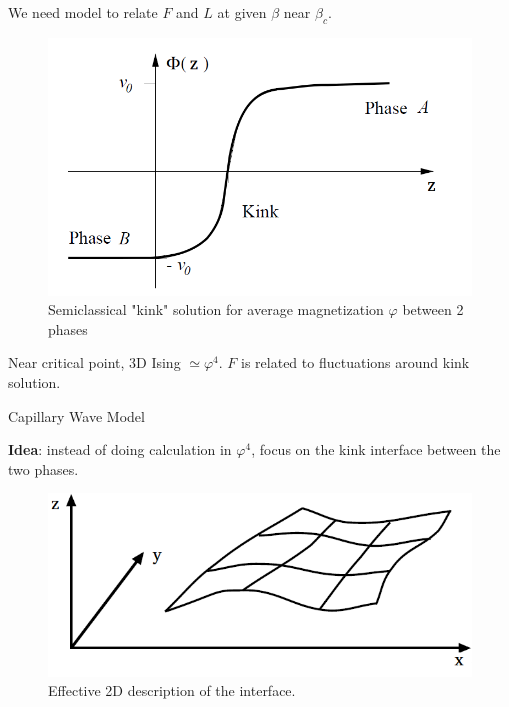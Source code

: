 \documentclass[12pt,handout]{beamer}
\begin{document}
\begin{frame}
\begin{center}
We need model to relate $F$ and $L$ at given $\beta$ near $\beta_c$.
\begin{figure}
\centering
\includegraphics[scale=0.30, center]{kink.png}
\caption{\centering Semiclassical "kink" solution for average magnetization $\varphi$ between 2 phases 
\label{fig:kink}}
\end{figure}

Near critical point, 3D Ising $\simeq \varphi ^4$. $F$ is related to fluctuations around kink solution.\\

\end{center}
\end{frame}

\begin{frame}{Capillary Wave Model}
\begin{center}
\vspace{5pt}
\textbf{Idea}: instead of doing calculation in $\varphi^4$, focus on the kink interface between the two phases.

\begin{figure}[!htb]
\centering
\includegraphics[scale=0.4]{CWM.png}
\caption{\centering Effective 2D description of the interface.}
\end{figure}

\end{center}
\end{frame}
\end{document}
